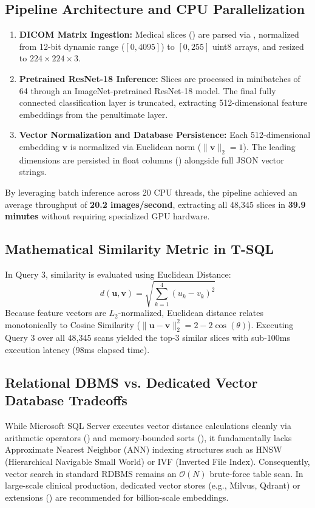 \subsection{Pipeline Architecture and CPU Parallelization}
\begin{enumerate}
    \item \textbf{DICOM Matrix Ingestion:} Medical slices () are parsed via , normalized from 12-bit dynamic range ($[0, 4095]$) to $[0, 255]$ uint8 arrays, and resized to $224 \times 224 \times 3$.
    \item \textbf{Pretrained ResNet-18 Inference:} Slices are processed in minibatches of 64 through an ImageNet-pretrained ResNet-18 model. The final fully connected classification layer is truncated, extracting 512-dimensional feature embeddings from the penultimate  layer.
    \item \textbf{Vector Normalization and Database Persistence:} Each 512-dimensional embedding $\mathbf{v}$ is normalized via Euclidean norm ($\|\mathbf{v}\|_2 = 1$). The leading dimensions are persisted in float columns () alongside full JSON vector strings.
\end{enumerate}

By leveraging batch inference across 20 CPU threads, the pipeline achieved an average throughput of \textbf{20.2 images/second}, extracting all 48,345 slices in \textbf{39.9 minutes} without requiring specialized GPU hardware.

\subsection{Mathematical Similarity Metric in T-SQL}
In Query 3, similarity is evaluated using Euclidean Distance:
\begin{equation}
    d(\mathbf{u}, \mathbf{v}) = \sqrt{\sum_{k=1}^4 (u_k - v_k)^2}
\end{equation}
Because feature vectors are $L_2$-normalized, Euclidean distance relates monotonically to Cosine Similarity ($\|\mathbf{u} - \mathbf{v}\|_2^2 = 2 - 2 \cos(\theta)$). Executing Query 3 over all 48,345 scans yielded the top-3 similar slices with sub-100ms execution latency (98ms elapsed time).

\subsection{Relational DBMS vs. Dedicated Vector Database Tradeoffs}
While Microsoft SQL Server executes vector distance calculations cleanly via arithmetic operators () and memory-bounded sorts (), it fundamentally lacks Approximate Nearest Neighbor (ANN) indexing structures such as HNSW (Hierarchical Navigable Small World) or IVF (Inverted File Index). Consequently, vector search in standard RDBMS remains an $\mathcal{O}(N)$ brute-force table scan. In large-scale clinical production, dedicated vector stores (e.g., Milvus, Qdrant) or extensions () are recommended for billion-scale embeddings.

